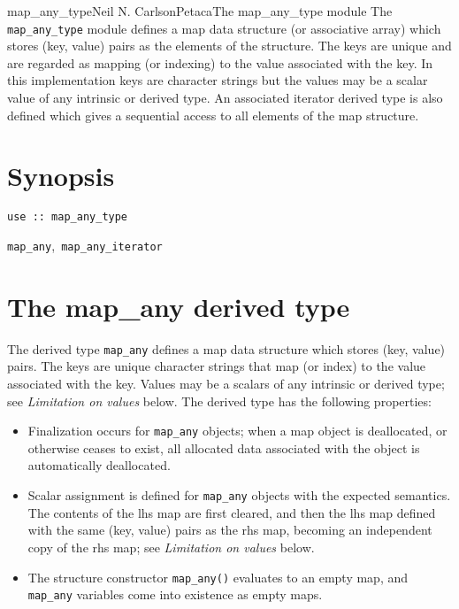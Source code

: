 \documentclass[11pt]{article}
\begin{document}

\begin{Name}{3}{map_any_type}{Neil N. Carlson}{Petaca}{The map_any_type module}
The \texttt{map_any_type} module defines a map data structure (or associative
array) which stores (key, value) pairs as the elements of the structure.
The keys are unique and are regarded as mapping (or indexing) to the value
associated with the key.  In this implementation keys are character strings
but the values may be a scalar value of any intrinsic or derived type.  An
associated iterator derived type is also defined which gives a sequential
access to all elements of the map structure.
\end{Name}

\section{Synopsis}
\begin{description}[style=nextline]
\item[Usage]
  \verb+use :: map_any_type+
\item[Derived Types]
  \texttt{map_any},\texttt{ map_any_iterator}
\end{description}

\section{The map_any derived type}
The derived type \texttt{map_any} defines a map data structure which stores
(key, value) pairs.  The keys are unique character strings that map (or index)
to the value associated with the key. Values may be a scalars of any intrinsic
or derived type; see \emph{Limitation on values} below.  The derived type has
the following properties:
\begin{itemize}\setlength{\itemsep}{0pt}
\item
  Finalization occurs for \texttt{map_any} objects; when a map object is
  deallocated, or otherwise ceases to exist, all allocated data associated
  with the object is automatically deallocated.
\item
  Scalar assignment is defined for \texttt{map_any} objects with the expected
  semantics.  The contents of the lhs map are first cleared, and then the lhs
  map defined with the same (key, value) pairs as the rhs map, becoming an
  independent copy of the rhs map; see \emph{Limitation on values} below.
\item
  The structure constructor \texttt{map_any()} evaluates to an empty map,
  and \texttt{map_any} variables come into existence as empty maps.
\end{itemize}
\end{document}
